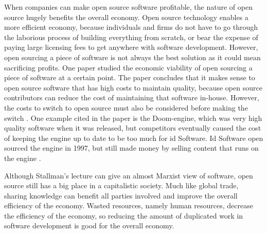 When companies can make open source software profitable, the nature of open source hugely benefits the overall economy.
Open source technology enables a more efficient economy, because individuals and firms do not have to go through the laborious process of building everything from scratch, or bear the expense of paying large licensing fees to get anywhere with software development.
However, open sourcing a piece of software is not always the best solution as it could mean sacrificing profits.
One paper studied the economic viability of open sourcing a piece of software at a certain point.
The paper concludes that it makes sense to open source software that has high costs to maintain quality, because open source contributors can reduce the cost of maintaining that software in-house.
However, the costs to switch to open source must also be considered before making the switch \cite{caulkins}.
One example cited in the paper is the Doom-engine, which was very high quality software when it was released, but competitors eventually caused the cost of keeping the engine up to date to be too much for id Software.
Id Software open sourced the engine in 1997, but still made money by selling content that runs on the engine \cite[p.~1188]{caulkins}.

Although Stallman's lecture can give an almost Marxist view of software, open source still has a big place in a capitalistic society.
Much like global trade, sharing knowledge can benefit all parties involved and improve the overall efficiency of the economy.
Wasted resources, namely human resources, decrease the efficiency of the economy, so reducing the amount of duplicated work in software development is good for the overall economy.
